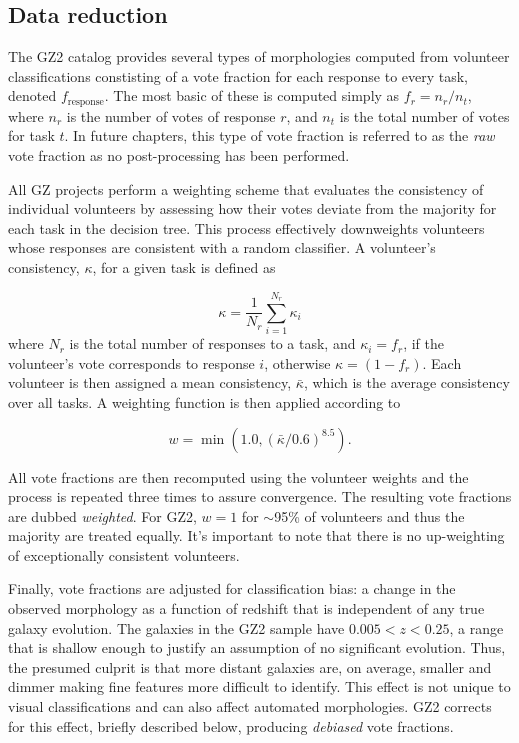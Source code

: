 \subsection{Data reduction}

The GZ2 catalog provides several types of morphologies computed from volunteer classifications constisting of a vote fraction for each response to every task, denoted $f_{\mathrm{response}}$. The most basic of these is computed simply as $f_r = n_r/n_t$, where $n_r$ is the number of votes of response $r$, and $n_t$ is the total number of votes for task $t$. In future chapters, this type of vote fraction is referred to as the \textit{raw} vote fraction as no post-processing has been performed. 

All GZ projects perform a weighting scheme that evaluates the consistency of individual volunteers by assessing how their votes deviate from the majority for each task in the decision tree. This process effectively downweights volunteers whose responses are consistent with a random classifier. A volunteer's consistency, $\kappa$, for a given task is defined as 

\begin{equation}
\kappa = \frac{1}{N_r}\sum_{i=1}^{N_r}{\kappa_i}
\end{equation}
where $N_r$ is the total number of responses to a task, and $\kappa_i = f_r$, if the volunteer's vote corresponds to response $i$, otherwise $\kappa=(1-f_r)$. Each volunteer is then assigned a mean consistency, $\bar\kappa$, which is the average consistency over all tasks. A weighting function is then applied according to  

\begin{equation}
w = \min({1.0, (\bar\kappa/0.6)^{8.5}}).
\end{equation}

All vote fractions are then recomputed using the volunteer weights and the process is repeated three times to assure convergence. The resulting vote fractions are dubbed \textit{weighted}. For GZ2, $w=1$ for $\sim$95\% of volunteers and thus the majority are treated equally. It's important to note that there is no up-weighting of exceptionally consistent volunteers.


Finally, vote fractions are adjusted for classification bias: a change in the observed morphology as a function of redshift that is independent of any true galaxy evolution. The galaxies in the GZ2 sample have $0.005<z<0.25$, a range that is shallow enough to justify an assumption of no significant evolution.  Thus, the presumed culprit is that more distant galaxies are, on average, smaller and dimmer making fine features more difficult to identify. This effect is not unique to visual classifications and can also affect automated morphologies. GZ2 corrects for this effect, briefly described below, producing \textit{debiased} vote fractions.

